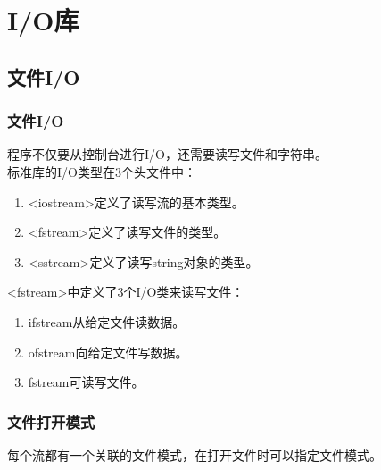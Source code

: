 \chapter{I/O库}

\section{文件I/O}

\subsection{文件I/O}

程序不仅要从控制台进行I/O，还需要读写文件和字符串。\\

标准库的I/O类型在3个头文件中：

\begin{enumerate}
	\item <iostream>定义了读写流的基本类型。
	\item <fstream>定义了读写文件的类型。
	\item <sstream>定义了读写string对象的类型。
\end{enumerate}

<fstream>中定义了3个I/O类来读写文件：

\begin{enumerate}
	\item ifstream从给定文件读数据。
	\item ofstream向给定文件写数据。
	\item fstream可读写文件。
\end{enumerate}

\vspace{0.5cm}

\subsection{文件打开模式}

每个流都有一个关联的文件模式，在打开文件时可以指定文件模式。

\begin{table}[H]
	\centering
	\caption{文件打开模式}
\end{table}

